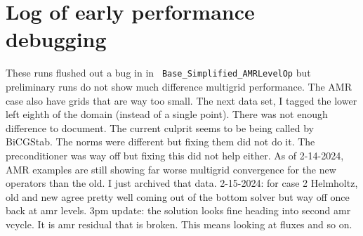 \documentclass{article}
\begin{document}
\section{Log of early performance debugging}
These runs flushed out a bug in in {\tt
  Base\_Simplified\_AMRLevelOp} but preliminary runs do not show much
difference multigrid performance.  The AMR case also have grids that
are way too small.    The next data set, I tagged the lower left eighth
of the domain (instead of a single point).   There was not enough
difference to document.  The current culprit seems to be being called
by BiCGStab.   The norms were different but fixing them did not do it.
The preconditioner was way off but fixing this did not help either.
As of 2-14-2024, AMR examples are still showing far worse multigrid convergence
for the new operators than the old.   I just archived that data.
2-15-2024: for case 2 Helmholtz, old and new agree pretty well coming
out of the bottom solver but way off once back at amr levels.
3pm update: the solution looks fine heading into second amr vcycle.   It
is amr residual that is broken.   This means looking at fluxes and so on.
\end{document}
